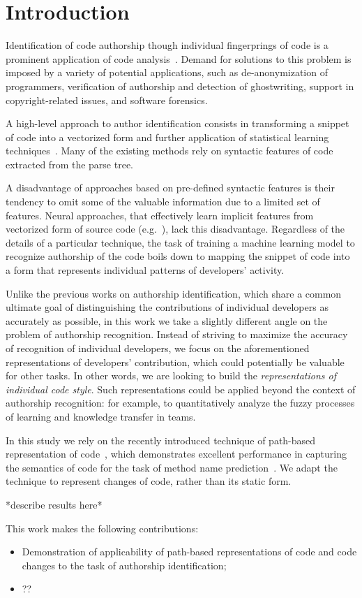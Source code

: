 \section{Introduction}
Identification of code authorship though individual fingerprings of code is a 
prominent application of code analysis~\cite{caliskan2015anonymizing}. Demand 
for solutions to this problem is imposed by a variety of potential applications,
such as de-anonymization of programmers, verification of authorship and 
detection of ghostwriting, support in copyright-related issues, and software 
forensics.

A high-level approach to author identification consists in transforming a snippet of code into a vectorized form and further application of statistical learning techniques~\cite{}.
Many of the existing methods rely on syntactic features of code extracted from the parse tree.~\cite{}

A disadvantage of approaches based on pre-defined syntactic features is their tendency to omit some of the valuable information due to a limited set of features. Neural approaches, that effectively learn implicit features from vectorized form of source code (e.g.~\cite{alsulami2017source}), lack this disadvantage. Regardless of the details of a particular technique, the task of training a machine learning model to recognize authorship of the code boils down to mapping the snippet of code into a form that represents individual patterns of developers' activity.

Unlike the previous works on authorship identification, which share a common ultimate goal of distinguishing the contributions of individual developers as accurately as possible, in this work we take a slightly different angle on the problem of authorship recognition. Instead of striving to maximize the accuracy of recognition of individual developers, we focus on the aforementioned representations of developers' contribution, which could potentially be valuable for other tasks. In other words, we are looking to build the \emph{representations of individual code style}. Such representations could be applied beyond the context of authorship recognition: for example, to quantitatively analyze the fuzzy processes of learning and knowledge transfer in teams.

In this study we rely on the recently introduced technique of path-based representation of code~\cite{alon2018general}, which demonstrates excellent performance in capturing the semantics of code for the task of method name prediction~\cite{alon2018code2vec}. We adapt the technique to represent changes of code, rather than its static form.

*describe results here*

This work makes the following contributions:
\begin{itemize}
    \item{Demonstration of applicability of path-based representations of code and code changes to the task of authorship identification;}
    \item{??}
\end{itemize}



